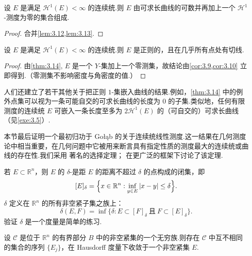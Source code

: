 \begin{theorem}\label{thm:3.14}
设 $E$ 是满足 $\mathcal{H}^1(E)<\infty$ 的连续统.则 $E$ 由可求长曲线的可数并再加上一个 $\mathcal{H}^1$-测度为零的集合组成.
\end{theorem}

\begin{proof}
合并\cref{lem:3.12,lem:3.13}.
\end{proof}

\begin{corollary}\label{cor:3.15}
设 $E$ 是满足 $\mathcal{H}^1(E)<\infty$ 的连续统.则 $E$ 是正则的，且在几乎所有点处有切线.
\end{corollary}

\begin{proof}
由\cref{thm:3.14}, $E$ 是一个 $Y$-集加上一个零测集，故结论由\cref{cor:3.9,cor:3.10} 立即得到.（零测集不影响密度与角密度的值.）
\end{proof}

人们还建立了若干其他关于把正则 $1$-集嵌入曲线的结果.例如，\cref{thm:3.14} 中的例外点集可以视为一条可能自交的可求长曲线的长度为 $0$ 的子集.类似地，任何有限测度的连续统 $E$ 可嵌入一条长度至多为 $2\mathcal{H}^1(E)$ 的（可自交的）可求长曲线（见\cref{exe:3.5}）.

本节最后证明一个最初归功于 Gołąb 的关于连续统线性测度.这一结果在几何测度论中相当重要，在几何问题中它被用来断言具有指定性质的测度最大的连续统或曲线的存在性.我们采用 \textcite{blaschke1916} 著名的选择定理；\textcite{rogers1970} 在更广泛的框架下讨论了该定理.

若 $E\subset\mathbb{R}^n$，则 $E$ 的 $\delta$-是距 $E$ 的距离不超过 $\delta$ 的点构成的闭集，即
\[
  [E]_{\delta}=\Bigl\{x\in\mathbb{R}^n:\inf_{y\in E}|x-y|\leq\delta\Bigr\}.
\]
 $\delta$ 定义在 $\mathbb{R}^n$ 的所有非空紧子集之族上：
\[
  \delta(E,F)=\inf\bigl\{\delta:E\subset[F]_{\delta}\ \text{且}\ F\subset[E]_{\delta}\bigr\}.
\]
验证 $\delta$ 是一个度量是简单的练习.

\begin{theorem}\label{thm:3.16}
设 $\mathcal{C}$ 是位于 $\mathbb{R}^n$ 的有界部分 $B$ 中的非空紧集的一个无穷族.则存在 $\mathcal{C}$ 中互不相同的集合的序列 $\{E_j\}$，在 Hausdorff 度量下收敛于一个非空紧集 $E$.
\end{theorem}


